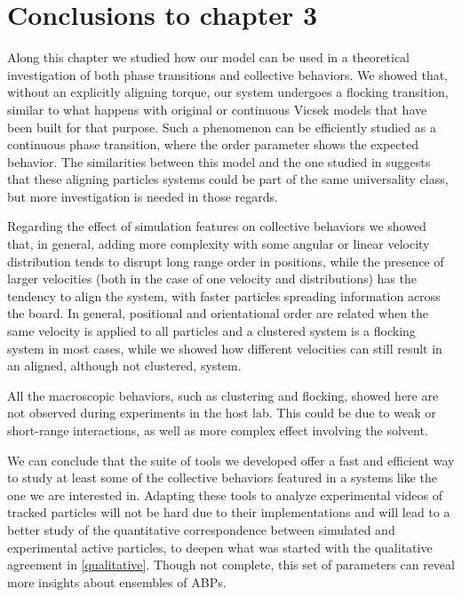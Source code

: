 \documentclass[../../master_thesis_np.tex]{subfiles}
\begin{document}
    \section{Conclusions to chapter 3}
    \label{3concl}
    Along this chapter we studied how our model can be used in a theoretical investigation of both phase transitions and collective behaviors.
    We showed that, without an explicitly aligning torque, our system undergoes a flocking transition, similar to what happens with original or continuous Vicsek models that have been built for that purpose.
    Such a phenomenon can be efficiently studied as a continuous phase transition, where the order parameter shows the expected behavior.
    The similarities between this model and the one studied in \cite{martin-gomez_collective_2018} suggests that these aligning particles systems could be part of the same universality class, but more investigation is needed in those regards.
    
    Regarding the effect of simulation features on collective behaviors we showed that, in general, adding more complexity with some angular or linear velocity distribution tends to disrupt long range order in positions, while the presence of larger velocities (both in the case of one velocity and distributions) has the tendency to align the system, with faster particles spreading information across the board.
    In general, positional and orientational order are related when the same velocity is applied to all particles and a clustered system is a flocking system in most cases, while we showed how different velocities can still result in an aligned, although not clustered, system.
    
    All the macroscopic behaviors, such as clustering and flocking, showed here are not observed during experiments in the host lab.
    This could be due to weak or short-range interactions, as well as more complex effect involving the solvent.
    
    
    We can conclude that the suite of tools we developed offer a fast and efficient way to study at least some of the collective behaviors featured in a systems like the one we are interested in.
    Adapting these tools to analyze experimental videos of tracked particles will not be hard due to their implementations and will lead to a better study of the quantitative correspondence between simulated and experimental active particles, to deepen what was started with the qualitative agreement in \ref{qualitative}.
    Though not complete, this set of parameters can reveal more insights about ensembles of ABPs.

    
\end{document}
